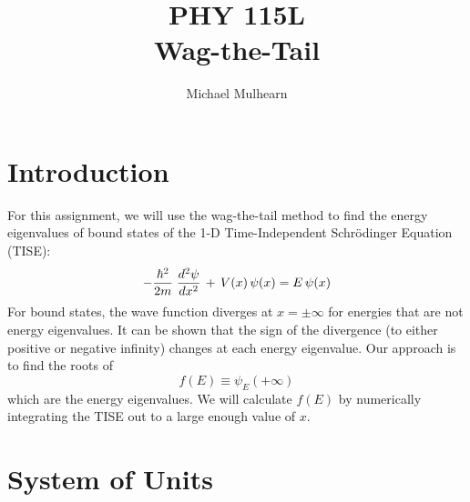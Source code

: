 \documentclass[12pt]{article}
\begin{document}
\newcommand{\ihbar}{\ensuremath{i \hbar}}
\newcommand{\Pss}{\ensuremath{\Psi^*}}
\newcommand{\dPsidt}{\ensuremath{ \frac{\partial \Psi}{\partial t} }}
\newcommand{\dPsidx}{\ensuremath{ \frac{\partial \Psi}{\partial x} }}
\newcommand{\ddPsidx}{\ensuremath{ \frac{\partial^2 \Psi}{\partial x^2} }}
\newcommand{\dPssdt}{\ensuremath{ \frac{\partial \Psi^*}{\partial t} }}
\newcommand{\dPssdx}{\ensuremath{ \frac{\partial \Psi^*}{\partial x} }}
\newcommand{\ddPssdx}{\ensuremath{ \frac{\partial^2 \Psi^*}{\partial x^2} }}

\newcommand{\dphidt}{\ensuremath{ \frac{d \phi}{dt} }}
\newcommand{\dpsidx}{\ensuremath{ \frac{d \psi}{dx} }}
\newcommand{\ddpsidx}{\ensuremath{ \frac{d^2 \psi}{dx^2} }}

\title{PHY 115L \\ Wag-the-Tail}
\author{Michael Mulhearn}

\maketitle

\section{Introduction}

For this assignment, we will use the wag-the-tail method to find the
energy eigenvalues of bound states of the 1-D Time-Independent
Schr\"odinger Equation (TISE):
\begin{equation}
- \frac{\hbar^2}{2 m} \; \ddpsidx \, + \, V(x) \, \psi(x) = E \, \psi(x)\\
\end{equation}
For bound states, the wave function diverges at $x=\pm\infty$ for
energies that are not energy eigenvalues.  It can be shown that the
sign of the divergence (to either positive or negative infinity)
changes at each energy eigenvalue.  Our approach is to find the roots
of
$$f(E) \equiv \psi_E(+\infty)$$ which are the energy eigenvalues.  We
will calculate $f(E)$ by numerically integrating the TISE out to a
large enough value of $x$.

\section{System of Units}
\end{document}
